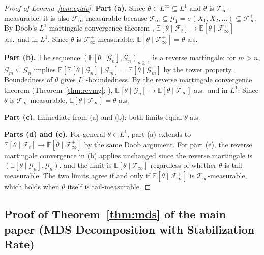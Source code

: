 \documentclass[bj,authoryear]{imsart}
\theoremstyle{plain}
\theoremstyle{definition}
\newcommand{\E}{\mathbb{E}}
\newcommand{\F}{\mathcal{F}}
\newcommand{\G}{\mathcal{G}}
\newcommand{\Tsig}{\mathcal{T}_\infty}
\newcommand{\given}{\mid}
\begin{document}
\label{app:proof-lemequiv}

\begin{proof}[Proof of Lemma~\ref{lem:equiv}]
  \textbf{Part (a).}
  Since $\theta \in L^\infty \subseteq L^1$ and $\theta$ is
  $\Tsig$-measurable, it is also $\F_\infty^+$-measurable because
  $\Tsig \subseteq \G_1 = \sigma(X_1,X_2,\ldots) \subseteq \F_\infty^+$.
  By Doob's $L^1$ martingale convergence theorem \citep{doob1953stochastic},
  $\E[\theta\given\F_t] \to \E[\theta\given\F_\infty^+]$ a.s.\ and in $L^1$.
  Since $\theta$ is $\F_\infty^+$-measurable,
  $\E[\theta\given\F_\infty^+] = \theta$ a.s.

  \textbf{Part (b).}
  The sequence $(\E[\theta\given\G_n], \G_n)_{n\geq 1}$ is a reverse
  martingale: for $m > n$, $\G_m \subseteq \G_n$ implies
  $\E[\E[\theta\given\G_n]\given\G_m] = \E[\theta\given\G_m]$ by the
  tower property.
  Boundedness of $\theta$ gives $L^1$-boundedness.
  By the reverse martingale convergence theorem
  (Theorem~\ref{thm:revmg}; \citealt{doob1953stochastic}),
  $\E[\theta\given\G_n] \to \E[\theta\given\Tsig]$ a.s.\ and in $L^1$.
  Since $\theta$ is $\Tsig$-measurable, $\E[\theta\given\Tsig] = \theta$
  a.s.

  \textbf{Part (c).}
  Immediate from (a) and (b): both limits equal $\theta$ a.s.

  \textbf{Parts (d) and (e).}
  For general $\theta \in L^1$, part (a) extends to
  $\E[\theta\given\F_t]\to\E[\theta\given\F_\infty^+]$ by the same Doob
  argument.  For part (e), the reverse martingale convergence in (b)
  applies unchanged since the reverse martingale is
  $(\E[\theta\given\G_n], \G_n)$, and the limit is
  $\E[\theta\given\Tsig]$ regardless of whether $\theta$ is
  tail-measurable.  The two limits agree if and only if
  $\E[\theta\given\F_\infty^+]$ is $\Tsig$-measurable, which holds when
  $\theta$ itself is tail-measurable.
\end{proof}

\subsection{Proof of Theorem~\ref{thm:mds} of the main paper (MDS Decomposition with Stabilization Rate)}
\label{app:proof-thmmds}
\end{document}
